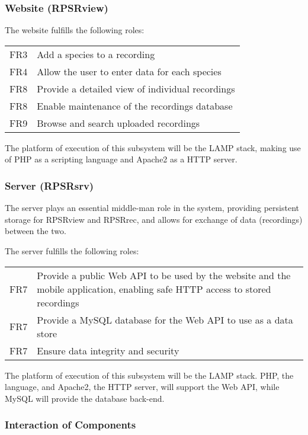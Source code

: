 \subsubsection{Website (RPSRview)}
    The website fulfills the following roles:\\    
    	\begin{tabular}{r | p{15cm}}
    		FR3 & Add a species to a recording \\
    		FR4 & Allow the user to enter data for each species\\
        	FR8 & Provide a detailed view of individual recordings \\
        	FR8 & Enable maintenance of the recordings database \\
    		FR9 & Browse and search uploaded recordings \\
        \end{tabular}
    The platform of execution of this subsystem will be the LAMP stack, making use of PHP as a scripting language and Apache2 as a HTTP server.
        
\subsubsection{Server (RPSRsrv)}
    The server plays an essential middle-man role in the system, providing persistent storage for RPSRview and RPSRrec,
    and allows for exchange of data (recordings) between the two. 

    The server fulfills the following roles:\\
    \begin{tabular}{r | p{15cm}}
        FR7 & Provide a public Web API to be used by the website and the mobile application, enabling safe HTTP access to stored recordings \\
        FR7 & Provide a MySQL database for the Web API to use as a data store \\
        FR7 & Ensure data integrity and security \\
	\end{tabular}
    The platform of execution of this subsystem will be the LAMP stack. PHP, the language, and Apache2, the HTTP server, will support the Web API, while MySQL will provide the database back-end.

\subsubsection{Interaction of Components}
	

